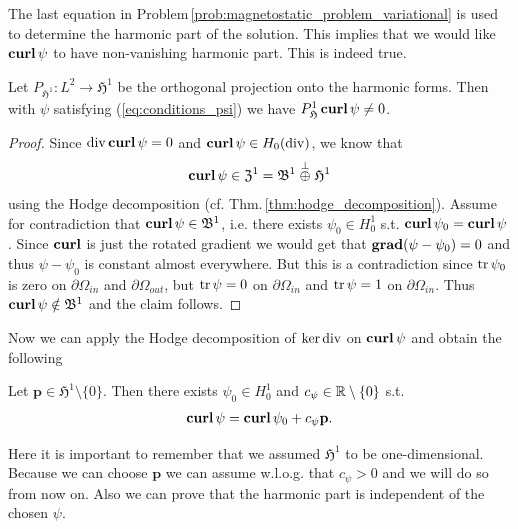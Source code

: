 \documentclass[../master_thesis.tex]{subfiles}
\begin{document}
The last equation in Problem\,\ref{prob:magnetostatic_problem_variational} 
is used to determine the harmonic part of the 
solution. This implies that we would like $\veccurl \psi$ to have 
non-vanishing harmonic part. This is indeed true.
\begin{proposition}
    Let $P_{\mathfrak{H}^1}: L^2 \rightarrow \mathfrak{H}^1$ be the orthogonal
    projection onto the harmonic forms. Then with $\psi$ satisfying (\ref{eq:conditions_psi})
    we have $P_\mathfrak{H}^1\veccurl \psi \neq 0$.
\end{proposition}
\begin{proof}
    Since $\diver \veccurl \psi = 0$ and $\veccurl \psi \in H_0(\diver)$, we know that 
    \begin{align*}
        \veccurl \psi \in \mathfrak{Z}^1 = \mathfrak{B}^1 \stackrel{\perp}{\oplus} \mathfrak{H}^1
    \end{align*}
    using the Hodge decomposition (cf. Thm.\,\ref{thm:hodge_decomposition}). 
    Assume for contradiction that $\veccurl \psi \in \mathfrak{B}^1$, i.e. there exists 
    $\psi_0 \in H^1_0$ s.t. $\veccurl \psi_0 = \veccurl \psi$. 
    Since $\veccurl$ is just the rotated gradient we would get that 
    $\bm{\grad} (\psi - \psi_0) = 0$ and thus $\psi - \psi_0$ is constant almost 
    everywhere. But this is a contradiction since $\tr \psi_0$ is zero on $\partial\Omega_{in}$ 
    and $\partial \Omega_{out}$, but $\tr \psi = 0$ on $\partial\Omega_{in}$ and 
    $\tr \psi = 1$ on $\partial\Omega_{in}$. 
    Thus $\veccurl \psi \notin \mathfrak{B}^1$ and the claim follows.
\end{proof}
Now we can apply the Hodge decomposition of $\ker \diver$ on
$\veccurl \psi$ and obtain the following
\begin{corollary}
    Let $\mathbf{p}\in \mathfrak{H}^1 \setminus \{ 0 \}$. Then there exists 
    $\psi_0 \in H^1_0$ and $c_\psi \in \real \setminus \{ 0 \}$ s.t. 
    \begin{align}
        \veccurl \psi = \veccurl \psi_0 + c_\psi \mathbf{p}. \label{eq:decomposition_psi}
    \end{align}
\end{corollary}
Here it is important to remember that we assumed $\mathfrak{H}^1$ to be one-dimensional.
Because we can choose $\mathbf{p}$ we can assume w.l.o.g. that $c_\psi > 0$ and 
we will do so from now on. Also we can prove that the harmonic part is 
independent of the chosen $\psi$.
\end{document}
